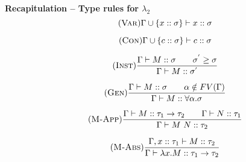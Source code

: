\documentclass{beamer}
\begin{document}

\begin{frame}[fragile]{\textbf{Recapitulation – Type rules for $\lambda_{2}$}}
\begin{equation}
\tag{\textsc{Var}}
\Gamma \cup \{x :: \sigma\} \vdash x :: \sigma
\label{eqn:Var}
\end{equation}

\begin{equation}
\tag{\textsc{Con}}
\Gamma \cup \{c :: \sigma\} \vdash c :: \sigma
\label{eqn:Con}
\end{equation}

\begin{equation}
\tag{\textsc{Inst}}
\frac{\Gamma \vdash M :: \sigma \qquad \sigma^{'} \geq \sigma}{\Gamma \vdash M :: \sigma^{'}}
\label{eqn:Inst}
\end{equation}

\begin{equation}
\tag{\textsc{Gen}}
\frac{\Gamma \vdash M :: \sigma \qquad \alpha \notin FV(\Gamma)}{\Gamma \vdash M :: \forall\alpha.\sigma}
\label{eqn:Gen}
\end{equation}

\begin{equation}
\tag{\textsc{M-App}}
\frac{\Gamma \vdash M :: \tau_{1} \rightarrow \tau_{2}\qquad\Gamma \vdash N :: \tau_{1}}{\Gamma \vdash M\ N :: \tau_{2}}
\label{eqn:M-App}
\end{equation}

\begin{equation}
\tag{\textsc{M-Abs}}
\frac{\Gamma,x :: \tau_{1} \vdash M :: \tau_{2}}{\Gamma \vdash \lambda x.M :: \tau_{1} \rightarrow \tau_{2}}
\label{eqn:M-Abs}
\end{equation}
\end{frame}

\end{document}
